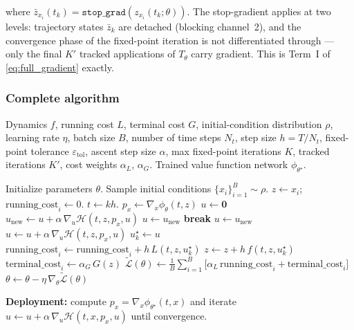 \documentclass{article}
\begin{document}
where $\bar{z}_{x_i}(t_k) = \texttt{stop\_grad}(z_{x_i}(t_k;\theta))$.
The stop-gradient applies at two levels: trajectory states $\bar{z}_k$ are
detached (blocking channel~2), and the convergence phase of the fixed-point
iteration is not differentiated through --- only the final $K'$ tracked
applications of $T_\theta$ carry gradient. This is Term~I of
\eqref{eq:full_gradient} exactly.

\subsubsection{Complete algorithm}


\begin{algorithm}[t]
\caption{End-to-end training with implicit Hamiltonians and Jacobian-Free Backpropagation (JFB)}
\label{alg:jfb-training}
\begin{algorithmic}[1]
\Require Dynamics $f$, running cost $L$, terminal cost $G$, initial-condition distribution $\rho$,
         learning rate $\eta$, batch size $B$, number of time steps $N_t$, step size $h=T/N_t$,
         fixed-point tolerance $\varepsilon_{\mathrm{tol}}$, ascent step size $\alpha$,
         max fixed-point iterations $K$, tracked iterations $K'$, cost weights $\alpha_L$, $\alpha_G$.
\Ensure Trained value function network $\phi_{\theta^\star}$.

\State Initialize parameters $\theta$.
\Repeat
  \State Sample initial conditions $\{x_i\}_{i=1}^{B} \sim \rho$.
    \State $z \gets x_i$; \quad $\mathrm{running\_cost}_i \gets 0$.
      \State $t \gets k h$.
      \State $p_x \gets \nabla_x\phi_\theta(t,z)$ 
      \State $u \gets \mathbf{0}$
       
        \State $u_{\mathrm{new}} \gets u + \alpha\,\nabla_u\mathcal{H}(t,z,p_x,u)$
          \State $u \gets u_{\mathrm{new}}$
          \State \textbf{break}
        \EndIf
        \State $u \gets u_{\mathrm{new}}$
      \EndFor
       
        \State $u \gets u + \alpha\,\nabla_u\mathcal{H}(t,z,p_x,u)$
      \EndFor
      \State $u_k^\star \gets u$
      \State $\mathrm{running\_cost}_i \gets \mathrm{running\_cost}_i + h\,L(t,z,u_k^\star)$
      \State $z \gets z + h\,f(t,z,u_k^\star)$ 
    \EndFor
    \State $\mathrm{terminal\_cost}_i \gets \alpha_G\,G(z)$
  \EndFor
  \State $\widetilde{\mathcal{L}}(\theta) \gets \frac{1}{B}\sum_{i=1}^{B}\bigl[\alpha_L\,\mathrm{running\_cost}_i + \mathrm{terminal\_cost}_i\bigr]$
  \State $\theta \gets \theta - \eta\,\nabla_\theta\widetilde{\mathcal{L}}(\theta)$ 

\State \textbf{Deployment:} compute $p_x=\nabla_x\phi_{\theta^\star}(t,x)$ and iterate $u \gets u + \alpha\,\nabla_u\mathcal{H}(t,x,p_x,u)$ until convergence.
\end{algorithmic}
\end{algorithm}
\end{document}

